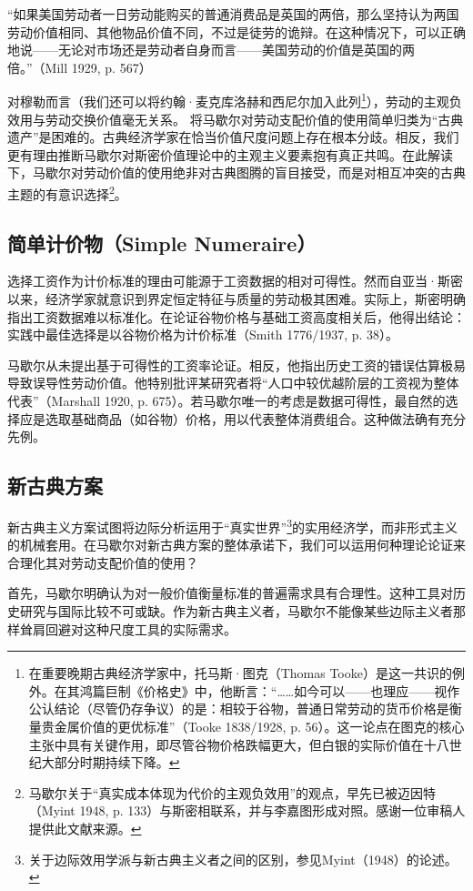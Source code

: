 \begin{translation}
“如果美国劳动者一日劳动能购买的普通消费品是英国的两倍，那么坚持认为两国劳动价值相同、其他物品价值不同，不过是徒劳的诡辩。在这种情况下，可以正确地说——无论对市场还是劳动者自身而言——美国劳动的价值是英国的两倍。”（Mill 1929, p. 567）

对穆勒而言（我们还可以将约翰·麦克库洛赫和西尼尔加入此列\footnote{在重要晚期古典经济学家中，托马斯·图克（Thomas Tooke）是这一共识的例外。在其鸿篇巨制《价格史》中，他断言：“……如今可以——也理应——视作公认结论（尽管仍存争议）的是：相较于谷物，普通日常劳动的货币价格是衡量贵金属价值的更优标准”（Tooke 1838/1928, p. 56）。这一论点在图克的核心主张中具有关键作用，即尽管谷物价格跌幅更大，但白银的实际价值在十八世纪大部分时期持续下降。}），劳动的主观负效用与劳动交换价值毫无关系。
将马歇尔对劳动支配价值的使用简单归类为“古典遗产”是困难的。古典经济学家在恰当价值尺度问题上存在根本分歧。相反，我们更有理由推断马歇尔对斯密价值理论中的主观主义要素抱有真正共鸣。在此解读下，马歇尔对劳动价值的使用绝非对古典图腾的盲目接受，而是对相互冲突的古典主题的有意识选择\footnote{马歇尔关于“真实成本体现为代价的主观负效用”的观点，早先已被迈因特（Myint 1948, p. 133）与斯密相联系，并与李嘉图形成对照。感谢一位审稿人提供此文献来源。}。

\subsection{简单计价物（Simple Numeraire）}

选择工资作为计价标准的理由可能源于工资数据的相对可得性。然而自亚当·斯密以来，经济学家就意识到界定恒定特征与质量的劳动极其困难。实际上，斯密明确指出工资数据难以标准化。在论证谷物价格与基础工资高度相关后，他得出结论：实践中最佳选择是以谷物价格为计价标准（Smith 1776/1937, p. 38）。

马歇尔从未提出基于可得性的工资率论证。相反，他指出历史工资的错误估算极易导致误导性劳动价值。他特别批评某研究者将“人口中较优越阶层的工资视为整体代表”（Marshall 1920, p. 675）。若马歇尔唯一的考虑是数据可得性，最自然的选择应是选取基础商品（如谷物）价格，用以代表整体消费组合。这种做法确有充分先例。

\subsection{新古典方案}
新古典主义方案试图将边际分析运用于“真实世界”\footnote{关于边际效用学派与新古典主义者之间的区别，参见Myint（1948）的论述。}的实用经济学，而非形式主义的机械套用。在马歇尔对新古典方案的整体承诺下，我们可以运用何种理论论证来合理化其对劳动支配价值的使用？

首先，马歇尔明确认为对一般价值衡量标准的普遍需求具有合理性。这种工具对历史研究与国际比较不可或缺。作为新古典主义者，马歇尔不能像某些边际主义者那样耸肩回避对这种尺度工具的实际需求。


\end{translation}
